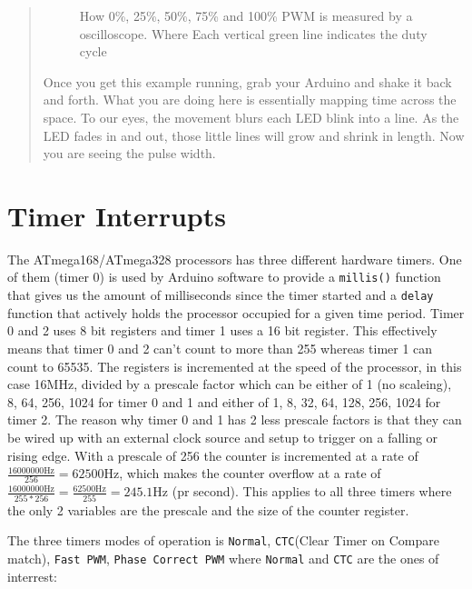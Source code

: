 \documentclass[a4paper,oneside, draft]{memoir}
\begin{document}
\begin{quotation}
\begin{figure}[h!]
    \caption{How 0\%, 25\%, 50\%, 75\% and 100\% PWM is measured by a
      oscilloscope. Where Each vertical green line indicates the duty
      cycle}
    \label{fig:pwm}
  \end{figure}


  Once you get this example running, grab your Arduino and shake it
  back and forth. What you are doing here is essentially mapping time
  across the space. To our eyes, the movement blurs each LED blink
  into a line. As the LED fades in and out, those little lines will
  grow and shrink in length. Now you are seeing the pulse width.
\end{quotation}


\section{Timer Interrupts}


The ATmega168/ATmega328 processors has three different hardware
timers. One of them (timer 0) is used by Arduino software to provide a
\texttt{millis()} function that gives us the amount of milliseconds
since the timer started and a \texttt{delay} function that actively
holds the processor occupied for a given time period. Timer 0 and 2
uses 8 bit registers and timer 1 uses a 16 bit register. This
effectively means that timer 0 and 2 can't count to more than 255
whereas timer 1 can count to 65535. The registers is incremented at
the speed of the processor, in this case 16MHz, divided by a prescale
factor which can be either of 1 (no scaleing), 8, 64, 256, 1024 for
timer 0 and 1 and either of 1, 8, 32, 64, 128, 256, 1024 for timer
2. The reason why timer 0 and 1 has 2 less prescale factors is that
they can be wired up with an external clock source and setup to
trigger on a falling or rising edge. With a prescale of 256 the
counter is incremented at a rate of $\frac{16000000\mathrm{Hz}}{256} =
62500\mathrm{Hz}$, which makes the counter overflow at a rate of
$\frac{16000000\mathrm{Hz}}{255*256} = \frac{62500\mathrm{Hz}}{255} =
245.1\mathrm{Hz}$ (pr second). This applies to all three timers where the only
2 variables are the prescale and the size of the counter register.

The three timers modes of operation is \texttt{Normal},
\texttt{CTC}(Clear Timer on Compare match), \texttt{Fast PWM},
\texttt{Phase Correct PWM} where \texttt{Normal} and \texttt{CTC} are
the ones of interrest:
\end{document}
